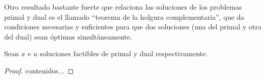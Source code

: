 Otro resultado bastante fuerte que relaciona las soluciones de los problemas primal y dual es el llamado ``teorema de la holgura complementaria'', que da condiciones necesarias y suficientes para que dos soluciones (una del primal y otra del dual) sean óptimas simultáneamente.
\begin{theo}
	Sean $x$ e $u$ soluciones factibles de primal y dual respectivamente.
\end{theo}
\begin{proof}
	contenidos...
\end{proof}